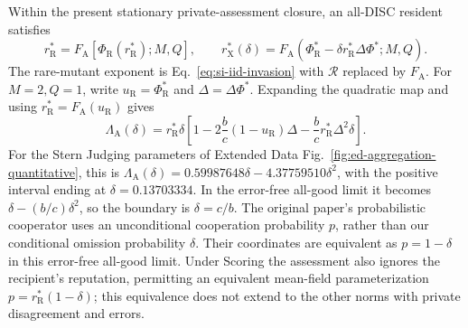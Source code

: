 \documentclass[fleqn,10pt]{wlscirep}
\begin{document}
Within the present stationary private-assessment closure, an all-DISC resident satisfies
\begin{equation}
r_{\mathrm R}^*=F_{\mathrm A}[\Phi_{\mathrm R}(r_{\mathrm R}^*);M,Q],
\qquad
r_{\mathrm X}^*(\delta)=F_{\mathrm A}(\Phi_{\mathrm R}^*-\delta r_{\mathrm R}^*\Delta\Phi^*;M,Q).
\label{eq:si-aggregation-resident-mutant}
\end{equation}
The rare-mutant exponent is Eq.~\eqref{eq:si-iid-invasion} with $\mathcal R$ replaced by $F_{\mathrm A}$. For $M=2,Q=1$, write $u_{\mathrm R}=\Phi_{\mathrm R}^*$ and $\Delta=\Delta\Phi^*$. Expanding the quadratic map and using $r_{\mathrm R}^*=F_{\mathrm A}(u_{\mathrm R})$ gives
\begin{equation}
\Lambda_{\mathrm A}(\delta)
=r_{\mathrm R}^*\delta\left[1-2\frac bc(1-u_{\mathrm R})\Delta
-\frac bc r_{\mathrm R}^*\Delta^2\delta\right].
\label{eq:si-aggregation-quadratic}
\end{equation}
For the Stern Judging parameters of Extended Data Fig.~\ref{fig:ed-aggregation-quantitative}, this is $\Lambda_{\mathrm A}(\delta)=0.59987648\delta-4.37759510\delta^2$, with the positive interval ending at $\delta=0.13703334$. In the error-free all-good limit it becomes $\delta-(b/c)\delta^2$, so the boundary is $\delta=c/b$. The original paper's probabilistic cooperator uses an unconditional cooperation probability $p$, rather than our conditional omission probability $\delta$. Their coordinates are equivalent as $p=1-\delta$ in this error-free all-good limit. Under Scoring the assessment also ignores the recipient's reputation, permitting an equivalent mean-field parameterization $p=r_{\mathrm R}^*(1-\delta)$; this equivalence does not extend to the other norms with private disagreement and errors.
\end{document}
